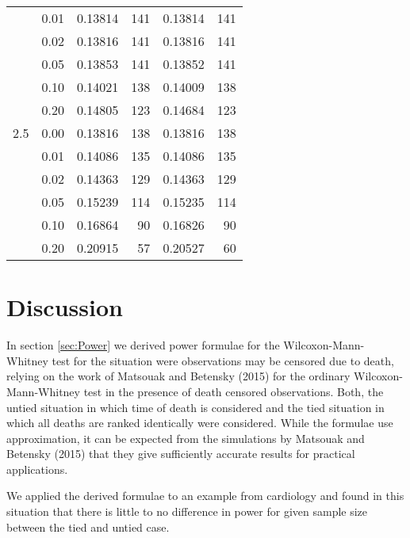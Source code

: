 \documentclass[bimj,fleqn]{w-art}\usepackage[]{graphicx}\usepackage[]{color}
\theoremstyle{plain}
\theoremstyle{definition}
\begin{document}
\begin{table}[ht]
\begin{tabular}{lrrrrr}
    & 0.01 & 0.13814 & 141 & 0.13814 & 141 \\ 
    & 0.02 & 0.13816 & 141 & 0.13816 & 141 \\ 
    & 0.05 & 0.13853 & 141 & 0.13852 & 141 \\ 
    & 0.10 & 0.14021 & 138 & 0.14009 & 138 \\ 
    & 0.20 & 0.14805 & 123 & 0.14684 & 123 \\ 
  2.5 & 0.00 & 0.13816 & 138 & 0.13816 & 138 \\ 
    & 0.01 & 0.14086 & 135 & 0.14086 & 135 \\ 
    & 0.02 & 0.14363 & 129 & 0.14363 & 129 \\ 
    & 0.05 & 0.15239 & 114 & 0.15235 & 114 \\ 
    & 0.10 & 0.16864 & 90 & 0.16826 & 90 \\ 
    & 0.20 & 0.20915 & 57 & 0.20527 & 60 \\ 
   \hline
\end{tabular}
\end{table}



\section{Discussion}
\label{sec:Discussion}
In section \ref{sec:Power} we derived power formulae for the Wilcoxon-Mann-Whitney
test for the situation were observations may be censored due to death, relying
on the work of Matsouak and Betensky (2015) for the ordinary Wilcoxon-Mann-Whitney
test in the presence of death censored observations. Both, the untied situation
in which time of death is considered and the tied situation in which all deaths
are ranked identically were considered. While the formulae use approximation,
it can be expected from the simulations by Matsouak and Betensky (2015) that they
give  sufficiently accurate results for practical applications.

We applied the derived formulae to an example from cardiology and found in this
situation that there is little to no difference in power for given sample size
between the tied and untied case.
\end{document}

